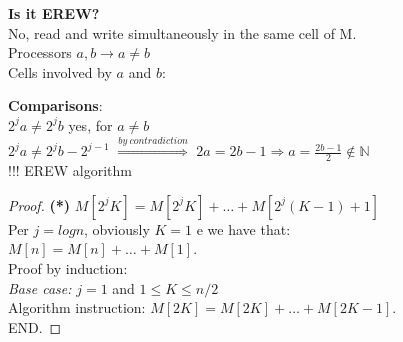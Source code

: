 \textbf{Is it EREW?}\\
No, read and write simultaneously in the same cell of M.\\

Processors $a,b \rightarrow a \neq b$ \\
Cells involved by $a$ and $b$:\\

\textbf{Comparisons}:\\
$2^{j}a \neq 2^{j}b$ yes, for $a \neq b$\\
$2^{j}a \neq 2^{j}b - 2^{j-1}$ $\overset{by \ contradiction}{\Rightarrow}$ $2a = 2b - 1 \Rightarrow a = \frac{2b-1}{2} \notin \mathbb{N}$\\
!!! EREW algorithm

\begin{proof}
\textbf{(*)} $M[2^{j}K] = M[2^{j}K] + \dots + M[2^{j}(K-1)+1]$\\
Per $j=log{n}$, obviously $K=1$ e we have that:\\
$M[n] = M[n] + \dots + M[1]$.\\
Proof by induction:\\
\textit{Base case:} $j=1$ and $1 \leq K \leq n/2$	\\
Algorithm instruction: $M[2K] = M[2K] + \dots + M[2K-1]$.\\
END.
\end{proof}

